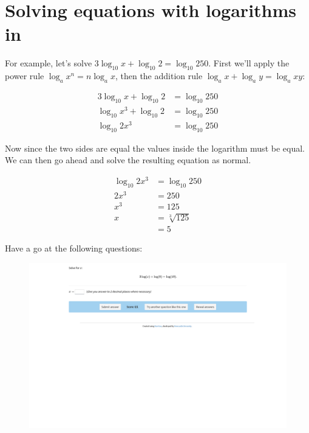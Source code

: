 \documentclass[
  a4paper,
]{scrbook}
\begin{document}
\hypertarget{solving-equations-with-logarithms-in}{%
\section{Solving equations with logarithms
in}\label{solving-equations-with-logarithms-in}}

For example, let's solve \(3\log_{10} x + \log_{10} 2 = \log_{10} 250\).
First we'll apply the power rule \(\log_{a} x^n = n\log_{a} x\), then
the addition rule \(\log_{a} x + \log_{a} y = \log_{a} xy\):

\[
\begin{aligned}
3\log_{10} x + \log_{10} 2 &= \log_{10} 250 \\
\log_{10} x^3 + \log_{10} 2 &= \log_{10} 250 \\
\log_{10} 2x^3 &= \log_{10} 250
\end{aligned}
\]

Now since the two sides are equal the values inside the logarithm must
be equal. We can then go ahead and solve the resulting equation as
normal.

\[
\begin{aligned}
\log_{10} 2x^3 &= \log_{10} 250 \\
2x^3 &= 250 \\
x^3 &= 125 \\
x &= \sqrt[3]{125} \\
 &= 5
\end{aligned}
\]

Have a go at the following questions:

\begin{figure}

{\centering 

\href{https://numbas.mathcentre.ac.uk/question/98356/logarithms-solving-logarithmic-equations-6-sum-of-logarithms/embed/?token=4dafb5d1-ca07-4bc5-a59f-7b18b7ff8ed8}{\includegraphics{./11-logarithms_files/figure-pdf/unnamed-chunk-2-1.png}}

}

\end{figure}
\end{document}
